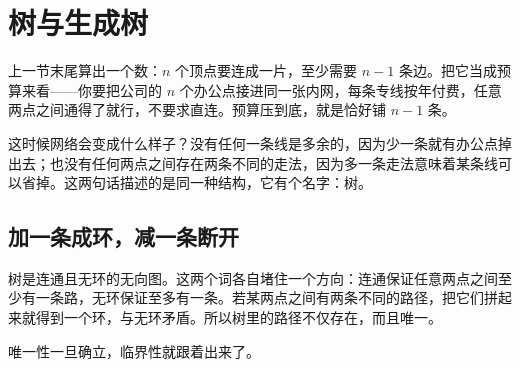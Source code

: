 \section{树与生成树}
\label{sec:04-Discrete-Mathematics/03-Graph-Theory/03}

上一节末尾算出一个数：\(n\) 个顶点要连成一片，至少需要 \(n-1\) 条边。把它当成预算来看——你要把公司的 \(n\) 个办公点接进同一张内网，每条专线按年付费，任意两点之间通得了就行，不要求直连。预算压到底，就是恰好铺 \(n-1\) 条。

这时候网络会变成什么样子？没有任何一条线是多余的，因为少一条就有办公点掉出去；也没有任何两点之间存在两条不同的走法，因为多一条走法意味着某条线可以省掉。这两句话描述的是同一种结构，它有个名字：树。

\subsection{加一条成环，减一条断开}

树是连通且无环的无向图。这两个词各自堵住一个方向：连通保证任意两点之间至少有一条路，无环保证至多有一条。若某两点之间有两条不同的路径，把它们拼起来就得到一个环，与无环矛盾。所以树里的路径不仅存在，而且唯一。

唯一性一旦确立，临界性就跟着出来了。

